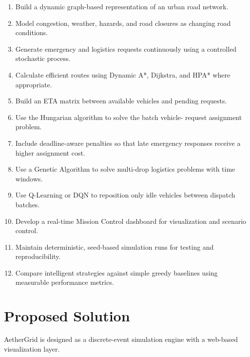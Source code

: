 \documentclass[12pt,a4paper]{article}
\begin{document}
\begin{enumerate}
    \item Build a dynamic graph-based representation of an urban road
    network.

    \item Model congestion, weather, hazards, and road closures as
    changing road conditions.

    \item Generate emergency and logistics requests continuously
    using a controlled stochastic process.

    \item Calculate efficient routes using Dynamic A*, Dijkstra,
    and HPA* where appropriate.

    \item Build an ETA matrix between available vehicles and pending
    requests.

    \item Use the Hungarian algorithm to solve the batch vehicle-
    request assignment problem.

    \item Include deadline-aware penalties so that late emergency
    responses receive a higher assignment cost.

    \item Use a Genetic Algorithm to solve multi-drop logistics
    problems with time windows.

    \item Use Q-Learning or DQN to reposition only idle vehicles
    between dispatch batches.

    \item Develop a real-time Mission Control dashboard for
    visualization and scenario control.

    \item Maintain deterministic, seed-based simulation runs for
    testing and reproducibility.

    \item Compare intelligent strategies against simple greedy
    baselines using measurable performance metrics.
\end{enumerate}





\section{Proposed Solution}

AetherGrid is designed as a discrete-event simulation engine with a
web-based visualization layer.
\end{document}
